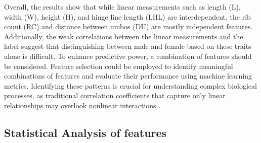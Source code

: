 Overall, the results show that while linear measurements such as length (L), width (W), height (H), and hinge line length (LHL) are interdependent, the rib count (RC) and distance between umbos (DU) are mostly independent features. Additionally, the weak correlations between the linear measurements and the label suggest that distinguishing between male and female \Tgranosa based on these traits alone is difficult. To enhance predictive power, a combination of features should be considered. Feature selection could be employed to identify meaningful combinations of features and evaluate their performance using machine learning metrics. Identifying these patterns is crucial for understanding complex biological processes, as traditional correlation coefficients that capture only linear relationships may overlook nonlinear interactions \cite{pividori2024}.

\subsection{Statistical Analysis of \Tgranosa features}

\begin{table}[H]
	\centering
	{\fontsize{8}{10}\selectfont 
	}
	\caption{ Dataset Overview and Exploration}
	\label{tab:descriptive-stat}
\end{table}

